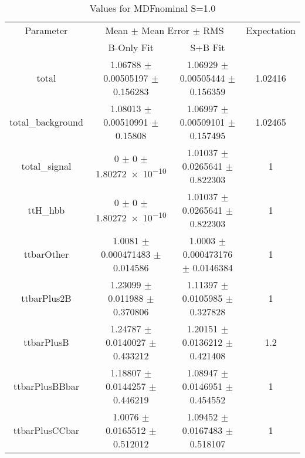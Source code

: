 \begin{table}
\centering
\caption{Values for MDFnominal S=1.0}
\begin{tabular}{cccc}
\toprule
Parameter & \multicolumn{2}{c}{Mean $\pm$ Mean Error $\pm$ RMS} & Expectation\\
 & B-Only Fit & S+B Fit & \\
\midrule
total & \num{1.06788} $\pm$ \num{0.00505197} $\pm$ \num{0.156283} & \num{1.06929} $\pm$ \num{0.00505444} $\pm$ \num{0.156359} & \num{1.02416}\\
total\_background & \num{1.08013} $\pm$ \num{0.00510991} $\pm$ \num{0.15808} & \num{1.06997} $\pm$ \num{0.00509101} $\pm$ \num{0.157495} & \num{1.02465}\\
total\_signal & \num{0} $\pm$ \num{0} $\pm$ \num{1.80272e-10} & \num{1.01037} $\pm$ \num{0.0265641} $\pm$ \num{0.822303} & \num{1}\\
ttH\_hbb & \num{0} $\pm$ \num{0} $\pm$ \num{1.80272e-10} & \num{1.01037} $\pm$ \num{0.0265641} $\pm$ \num{0.822303} & \num{1}\\
ttbarOther & \num{1.0081} $\pm$ \num{0.000471483} $\pm$ \num{0.014586} & \num{1.0003} $\pm$ \num{0.000473176} $\pm$ \num{0.0146384} & \num{1}\\
ttbarPlus2B & \num{1.23099} $\pm$ \num{0.011988} $\pm$ \num{0.370806} & \num{1.11397} $\pm$ \num{0.0105985} $\pm$ \num{0.327828} & \num{1}\\
ttbarPlusB & \num{1.24787} $\pm$ \num{0.0140027} $\pm$ \num{0.433212} & \num{1.20151} $\pm$ \num{0.0136212} $\pm$ \num{0.421408} & \num{1.2}\\
ttbarPlusBBbar & \num{1.18807} $\pm$ \num{0.0144257} $\pm$ \num{0.446219} & \num{1.08947} $\pm$ \num{0.0146951} $\pm$ \num{0.454552} & \num{1}\\
ttbarPlusCCbar & \num{1.0076} $\pm$ \num{0.0165512} $\pm$ \num{0.512012} & \num{1.09452} $\pm$ \num{0.0167483} $\pm$ \num{0.518107} & \num{1}\\
\bottomrule
\end{tabular}
\end{table}